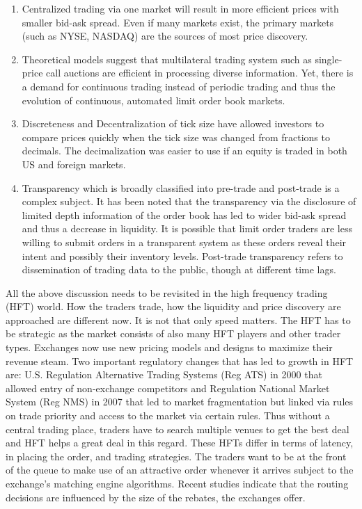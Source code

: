 \begin{enumerate}[--]
\item Centralized trading via one market will result in more efficient prices with smaller bid-ask spread. Even if many markets exist, the primary markets (such as NYSE, NASDAQ) are the sources of most price discovery.

\item Theoretical models suggest that multilateral trading system such as single-price call auctions are efficient in processing diverse information. Yet, there is a demand for continuous trading instead of periodic trading and thus the evolution of continuous, automated limit order book markets. 

\item Discreteness and Decentralization of tick size have allowed investors to compare prices quickly when the tick size was changed from fractions to decimals. The decimalization was easier to use if an equity is traded in both US and foreign markets.

\item Transparency which is broadly classified into pre-trade and post-trade is a complex subject. It has been noted that the transparency via the disclosure of limited depth information of the order book has led to wider bid-ask spread and thus a decrease in liquidity. It is possible that limit order traders are less willing to submit orders in a transparent system as these orders reveal their intent and possibly their inventory levels. Post-trade transparency refers to dissemination of trading data to the public, though at different time lags.   
\end{enumerate}


All the above discussion needs to be revisited in the high frequency trading (HFT) world. How the traders trade, how the liquidity and price discovery are approached are different now. It is not that only speed matters. The HFT has to be strategic as the market consists of also many HFT players and other trader types. Exchanges now use new pricing models and designs to maximize their revenue steam. Two important regulatory changes that has led to growth in HFT are: U.S. Regulation Alternative Trading Systems (Reg ATS) in 2000 that allowed entry of non-exchange competitors and Regulation National Market System (Reg NMS) in 2007 that led to market fragmentation but linked via rules on trade priority and access to the market via certain rules. Thus without a central trading place, traders have to search multiple venues to get the best deal and HFT helps a great deal in this regard. These HFTs differ in terms of latency, in placing the order, and trading strategies. The traders want to be at the front of the queue to make use of an attractive order whenever it arrives subject to the exchange's matching engine algorithms. Recent studies indicate that the routing decisions are influenced by the size of the rebates, the exchanges offer. 


